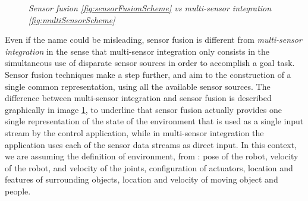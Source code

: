 \begin{figure}
	\centering
	\qquad
	\caption{\textit{Sensor fusion \ref{fig:sensorFusionScheme} vs multi-sensor integration \ref{fig:multiSensorScheme}}}
	\label{fig:fusionVsMultiSensor}
\end{figure}

Even if the name could be misleading, sensor fusion is different from \textit{multi-sensor integration} in the sense that multi-sensor integration only consists in the simultaneous use of disparate sensor sources in order to accomplish a goal task. Sensor fusion techniques make a step further, and aim to the construction of a single common representation, using all the available sensor sources. The difference between multi-sensor integration and sensor fusion is described graphically in image \ref{fig:fusionVsMultiSensor}, to underline that sensor fusion actually provides one single representation of the state of the environment that is used as a single input stream by the control application, while in multi-sensor integration the application uses each of the sensor data streams as direct input. In this context, we are assuming the definition of environment, from \cite{stateOfEnvironment}: pose of the robot, 	velocity of the robot, and velocity of the joints, configuration of actuators, location and features of surrounding objects, location and velocity of moving object and people.


